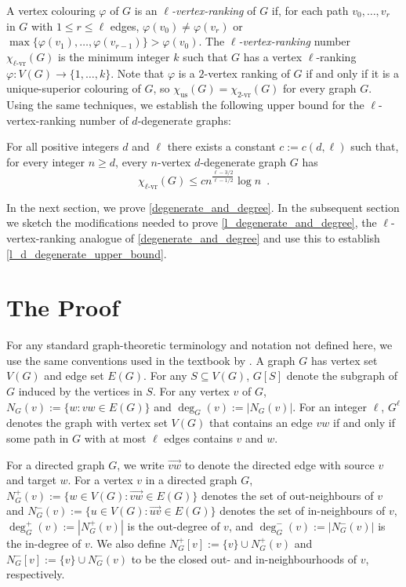 \documentclass{patmorin}
\newcommand{\defin}[1]{\emph{\color{brightmaroon}#1}}
\newcommand{\rn}[1]{\chi_{\operatorname{#1-vr}}}
\newcommand{\trn}{\chi_{\mathrm{us}}}
\newcommand{\lrn}{\rn{\ell}}
\begin{document}
A vertex colouring $\varphi$ of $G$ is an \defin{$\ell$-vertex-ranking} of $G$ if, for each path $v_0,\ldots,v_r$ in $G$ with $1\le r\le\ell$ edges, $\varphi(v_0)\neq \varphi(v_r)$ or $\max\{\varphi(v_1),\ldots,\varphi(v_{r-1})\}>\varphi(v_0)$.  The \defin{$\ell$-vertex-ranking} number $\lrn(G)$ is the minimum integer $k$ such that $G$ has a vertex $\ell$-ranking $\varphi:V(G)\to\{1,\ldots,k\}$.  Note that $\varphi$ is a $2$-vertex ranking of $G$ if and only if it is a unique-superior colouring of $G$, so $\trn(G)=\rn{2}(G)$ for every graph $G$.  Using the same techniques, we establish the following upper bound for the $\ell$-vertex-ranking number of $d$-degenerate graphs:

\begin{thm}\label{l_d_degenerate_upper_bound}
  For all positive integers $d$ and $\ell$ there exists a constant $c:=c(d,\ell)$ such that, for every integer $n\ge d$, every $n$-vertex $d$-degenerate graph $G$ has
  \[
    \lrn(G)\le c n^{\frac{\ell-3/2}{\ell-1/2}}\log n \enspace .
  \]
\end{thm}

In the next section, we prove \cref{degenerate_and_degree}.  In the subsequent section we sketch the modifications needed to prove \cref{l_degenerate_and_degree}, the $\ell$-vertex-ranking analogue of  \cref{degenerate_and_degree} and use this to establish \cref{l_d_degenerate_upper_bound}.



\section{The Proof}

For any standard graph-theoretic terminology and notation not defined here, we use the same conventions used in the textbook by \citet{diestel:graph}.  A graph $G$ has vertex set $V(G)$ and edge set $E(G)$.  For any $S\subseteq V(G)$, $G[S]$ denote the subgraph of $G$ induced by the vertices in $S$.  For any vertex $v$ of $G$, $N_G(v):=\{w:vw\in E(G)\}$ and $\deg_G(v):=|N_G(v)|$.  For an integer $\ell$, $G^\ell$ denotes the graph with vertex set $V(G)$ that contains an edge $vw$ if and only if some path in $G$ with at most $\ell$ edges contains $v$ and $w$.

For a directed graph $G$, we write $\overrightarrow{vw}$ to denote the directed edge with source $v$ and target $w$.  For a vertex $v$ in a directed graph $G$, $N^+_{G}(v):=\{w\in V(G):\overrightarrow{vw}\in E(G)\}$ denotes the set of out-neighbours of $v$ and $N^-_G(v):=\{u\in V(G):\overrightarrow{uv}\in E(G)\}$ denotes the set of in-neighbours of $v$, $\deg^+_{G}(v):=|N^+_G(v)|$ is the out-degree of $v$, and $\deg^-_{G}(v):=|N^-_G(v)|$ is the in-degree of $v$. We also define $N^+_{G}[v]:=\{v\}\cup N^+_{G}(v)$ and $N^-_{G}[v]:=\{v\}\cup N^-_{G}(v)$ to be the closed out- and in-neighbourhoods of $v$, respectively.
\end{document}

